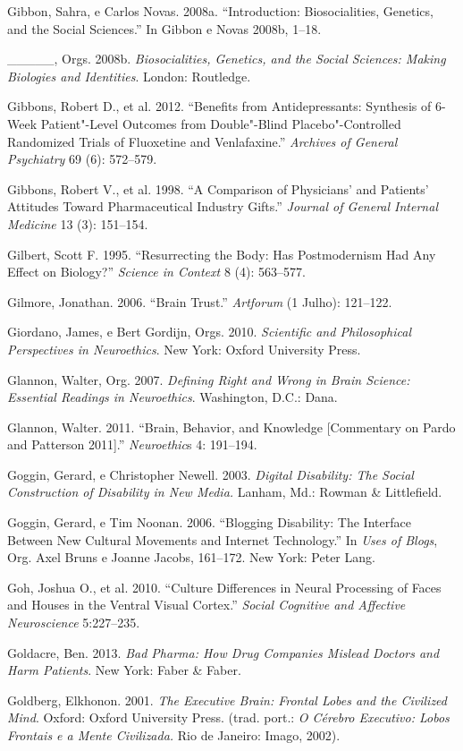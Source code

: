 {\begin{Parskip}
Gibbon, Sahra, e Carlos Novas. 2008a. ``Introduction: Biosocialities,
Genetics, and the Social Sciences.'' In Gibbon e Novas 2008b, 1--18.

\_\_\_\_\_, Orgs. 2008b. \emph{Biosocialities, Genetics, and the Social
Sciences: Making Biologies and Identities}. London: Routledge.

Gibbons, Robert D., et al. 2012. ``Benefits from Antidepressants:
Synthesis of 6-Week Patient"-Level Outcomes from Double"-Blind
Placebo"-Controlled Randomized Trials of Fluoxetine and Venlafaxine.''
\emph{Archives of General Psychiatry} 69 (6): 572--579.

Gibbons, Robert V., et al. 1998. ``A Comparison of Physicians' and
Patients' Attitudes Toward Pharmaceutical Industry Gifts.''
\emph{Journal of General Internal Medicine} 13 (3): 151--154.

Gilbert, Scott F. 1995. ``Resurrecting the Body: Has Postmodernism Had
Any Effect on Biology?'' \emph{Science in Context} 8 (4): 563--577.

Gilmore, Jonathan. 2006. ``Brain Trust.'' \emph{Artforum} (1 Julho):
121--122.

Giordano, James, e Bert Gordijn, Orgs. 2010. \emph{Scientific and
Philosophical Perspectives in Neuroethics}. New York: Oxford University
Press.

Glannon, Walter, Org. 2007. \emph{Defining Right and Wrong in Brain
Science: Essential Readings in Neuroethics}. Washington, D.C.: Dana.

Glannon, Walter. 2011. ``Brain, Behavior, and Knowledge {[}Commentary on
Pardo and Patterson 2011{]}.'' \emph{Neuroethic}s 4: 191--194.

Goggin, Gerard, e Christopher Newell. 2003. \emph{Digital Disability:
The Social Construction of Disability in New Media.} Lanham, Md.: Rowman
\& Littlefield.

Goggin, Gerard, e Tim Noonan. 2006. ``Blogging Disability: The Interface
Between New Cultural Movements and Internet Technology.'' In \emph{Uses
of Blogs}, Org. Axel Bruns e Joanne Jacobs, 161--172. New York: Peter
Lang.

Goh, Joshua O., et al. 2010. ``Culture Differences in Neural Processing
of Faces and Houses in the Ventral Visual Cortex.'' \emph{Social
Cognitive and Affective Neuroscience} 5:227--235.

Goldacre, Ben. 2013. \emph{Bad Pharma: How Drug Companies Mislead
Doctors and Harm Patients}. New York: Faber \& Faber.

Goldberg, Elkhonon. 2001. \emph{The Executive Brain: Frontal Lobes and
the Civilized Mind}. Oxford: Oxford University Press. (trad. port.:
\emph{O Cérebro Executivo: Lobos Frontais e a Mente Civilizada.} Rio de
Janeiro: Imago, 2002).


\end{Parskip}}
